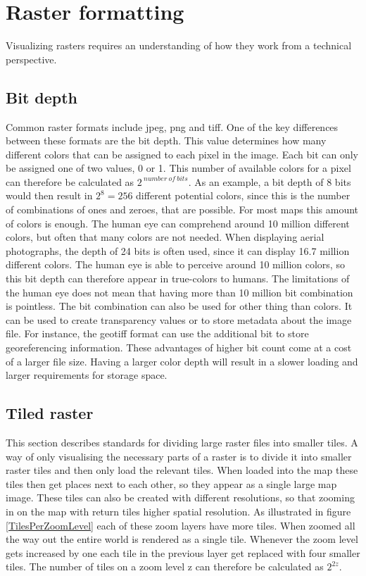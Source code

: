 \chapter{Raster formatting}\label{CRasterFormatting}

Visualizing rasters requires an understanding of how they work from a technical perspective.

\section{Bit depth} 
Common raster formats include jpeg, png and tiff. One of the key differences between these formats are the bit depth. This value determines how many different colors that can be assigned to each pixel in the image. Each bit can only be assigned one of two values, 0 or 1. This number of available colors for a pixel can therefore be calculated as $2^{\:number\: of\: bits}$. As an example, a bit depth of 8 bits would then result in $2^8 = 256$ different potential colors, since this is the number of combinations of ones and zeroes, that are possible. For most maps this amount of colors is enough. The human eye can comprehend around 10 million different colors, but often that many colors are not needed. When displaying aerial photographs, the depth of 24 bits is often used, since it can display 16.7 million different colors. The human eye is able to perceive around 10 million colors, so this bit depth can therefore appear in true-colors to humans.
The limitations of the human eye does not mean that having more than 10 million bit combination is pointless. The bit combination can also be used for other thing than colors. It can be used to create transparency values or to store metadata about the image file. For instance, the geotiff format can use the additional bit to store georeferencing information.
These advantages of higher bit count come at a cost of a larger file size. Having a larger color depth will result in a slower loading and larger requirements for storage space. \citep{Dent} %

\section{Tiled raster}
This section describes standards for dividing large raster files into smaller tiles. 
A way of only visualising the necessary parts of a raster is to divide it into smaller raster tiles and then only load the relevant tiles. When loaded into the map these tiles then get places next to each other, so they appear as a single large map image. These tiles can also be created with different resolutions, so that zooming in on the map with return tiles higher spatial resolution.  As illustrated in figure \ref{TilesPerZoomLevel} each of these zoom layers have more tiles.
\citep{Liedman}
When zoomed all the way out the entire world is rendered as a single tile. Whenever the zoom level gets increased by one each tile in the previous layer get replaced with four smaller tiles. The number of tiles on a zoom level z can therefore be calculated as $2^{2z}$.
\citep{SlippyMap}

